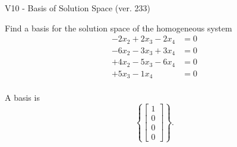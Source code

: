 \begin{exercise}
  \begin{exerciseTitle}V10 - Basis of Solution Space (ver. 233)\end{exerciseTitle}
  \begin{exerciseStatement}
    Find a basis for the solution space of the homogeneous system 
\begin{align*}
 -2 x_ 2 + 2 x_ 3 -2 x_ 4 &= 0  \\ 
  -6 x_ 2 -3 x_ 3 + 3 x_ 4 &= 0  \\ 
  + 4 x_ 2 -5 x_ 3 -6 x_ 4 &= 0  \\ 
  + 5 x_ 3 -1 x_ 4 &= 0  \\ 
 \end{align*}


 
  \end{exerciseStatement}

  \begin{exerciseAnswer}
   A basis is   
\[\left\{\left[\begin{array}{c}
1 \\
0 \\
0 \\
0
\end{array}\right]\right\}.\]

  


  \end{exerciseAnswer}
\end{exercise}